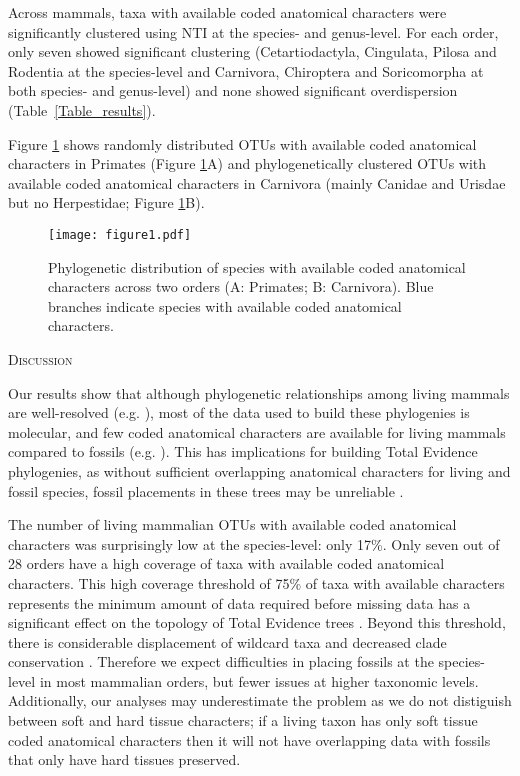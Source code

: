 \documentclass[12pt,letterpaper]{article}
\renewcommand{\section}[1]{%
\bigskip
\begin{center}
\begin{Large}
\normalfont\scshape #1
\medskip
\end{Large}
\end{center}}
\begin{document}
Across mammals, taxa with available coded anatomical characters were significantly clustered using NTI at the species- and genus-level.
For each order, only seven showed significant clustering (Cetartiodactyla, Cingulata, Pilosa and Rodentia at the species-level and Carnivora, Chiroptera and Soricomorpha at both species- and genus-level) and none showed significant overdispersion (Table~\ref{Table_results}).

Figure \ref{Figure_example_coverage} shows randomly distributed OTUs with available coded anatomical characters in Primates (Figure \ref{Figure_example_coverage}A) and phylogenetically clustered OTUs with available coded anatomical characters in Carnivora (mainly Canidae and Urisdae but no Herpestidae; Figure \ref{Figure_example_coverage}B).

\begin{figure}[!htbp]
\centering
   \texttt{[image: figure1.pdf]}
\caption{Phylogenetic distribution of species with available coded anatomical characters across two orders (A: Primates; B: Carnivora).
Blue branches indicate species with available coded anatomical characters.}
\label{Figure_example_coverage}
\end{figure}

%
%

\section{Discussion}
Our results show that although phylogenetic relationships among living mammals are well-resolved (e.g. \cite{BinindaEmonds,meredithimpacts2011}), most of the data used to build these phylogenies is molecular, and few coded anatomical characters are available for living mammals compared to fossils (e.g. \cite{O'Leary08022013,ni2013oldest}).
This has implications for building Total Evidence phylogenies, as without sufficient overlapping anatomical characters for living and fossil species, fossil placements in these trees may be unreliable \cite{GuillermeCooper}. 

The number of living mammalian OTUs with available coded anatomical characters was surprisingly low at the species-level: only 17\%.
Only seven out of 28 orders have a high coverage of taxa with available coded anatomical characters.
This high coverage threshold of 75\% of taxa with available characters represents the minimum amount of data required before missing data has a significant effect on the topology of Total Evidence trees \cite{GuillermeCooper}.
Beyond this threshold, there is considerable displacement of wildcard taxa and decreased clade conservation \cite{GuillermeCooper}.
Therefore we expect difficulties in placing fossils at the species-level in most mammalian orders, but fewer issues at higher taxonomic levels.
Additionally, our analyses may underestimate the problem as we do not distiguish between soft and hard tissue characters; if a living taxon has only soft tissue coded anatomical characters then it will not have overlapping data with fossils that only have hard tissues preserved. 
\end{document}
